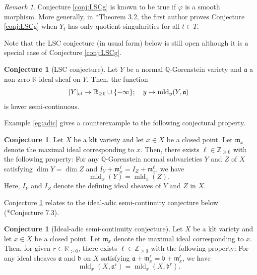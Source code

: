 \documentclass[a4paper,11pt]{amsart}
\theoremstyle{definition}
\newtheorem{conj}[thm]{Conjecture}
\theoremstyle{remark}
\newtheorem{rmk}[thm]{Remark}
\begin{document}
\begin{rmk}
Conjecture \ref{conj:LSCg} is known to be true if $\varphi$ is a smooth morphism. 
More generally, in \cite{Nak16}*{Theorem 3.2}, the first author proves  
Conjecture \ref{conj:LSCg} when $Y_t$ has only quotient singularities for all $t \in T$. 
\end{rmk}

\noindent
Note that the LSC conjecture (in usual form) below is still open although it is a special case of Conjecture \ref{conj:LSCg}.
\begin{conj}[LSC conjecture]\label{conj:LSC}
Let $Y$ be a normal $\mathbb{Q}$-Gorenstein variety and $\mathfrak{a}$ a non-zero $\mathbb{R}$-ideal sheaf on $Y$. 
Then, the function
\[
|Y|_{\rm cl} \to \mathbb{R}_{\ge 0} \cup \{ - \infty \}; \quad y \mapsto \operatorname{mld}_{y} (Y, \mathfrak{a})
\]
is lower semi-continuous. 
\end{conj}

Example \ref{eg:adic} gives a counterexample to the following conjectural property. 
\begin{conj}\label{conj:LSCadica}
Let $X$ be a klt variety and let $x \in X$ be a closed point.  
Let $\mathfrak{m}_x$ denote the maximal ideal corresponding to $x$. 
Then, there exists $\ell \in \mathbb{Z}_{\ge 0}$ with the following property: 
For any $\mathbb{Q}$-Gorenstein normal subvarieties $Y$ and $Z$ of $X$ satisfying 
$\dim Y = \dim Z$ and $I_Y + \mathfrak{m}_x ^{\ell} = I_Z + \mathfrak{m}_x ^{\ell}$, we have 
\[
\operatorname{mld}_x(Y) = \operatorname{mld}_x(Z). 
\]
Here, $I_Y$ and $I_Z$ denote the defining ideal sheaves of $Y$ and $Z$ in $X$. 
\end{conj}

\noindent
Conjecture \ref{conj:LSCadica} relates to the ideal-adic semi-continuity conjecture below (\cite{MN18}*{Conjecture 7.3}). 
\begin{conj}[Ideal-adic semi-continuity conjecture]\label{conj:LSCadic}
Let $X$ be a klt variety and let $x \in X$ be a closed point.  
Let $\mathfrak{m}_x$ denote the maximal ideal corresponding to $x$. 
Then, for given $r \in \mathbb{R}_{> 0}$, there exists $\ell \in \mathbb{Z}_{\ge 0}$ with the following property: 
For any ideal sheaves $\mathfrak{a}$ and $\mathfrak{b}$ on $X$ satisfying $\mathfrak{a} + \mathfrak{m}_x ^{\ell} = \mathfrak{b} + \mathfrak{m}_x ^{\ell}$, we have 
\[
\operatorname{mld}_x(X, \mathfrak{a}^r) = \operatorname{mld}_x(X, \mathfrak{b}^r). 
\]
\end{conj}
\end{document}
